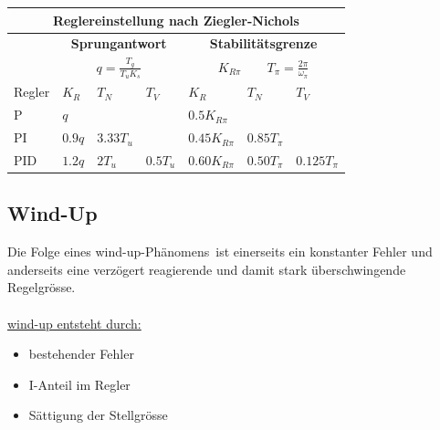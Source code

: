 	\begin{tabular}{|l|l|l|l|l|l|l|}
		\hline
		\multicolumn{7}{|c|}{
		  \textbf{Reglereinstellung nach Ziegler-Nichols}
		}
		\\ \hline
		& \multicolumn{3}{|c|}{\textbf{Sprungantwort}}
		& \multicolumn{3}{|c|}{\textbf{Stabilitätsgrenze}}
		\\
	    & \multicolumn{3}{|c|}{$q = \frac{T_g}{T_uK_s}$}
		& \multicolumn{3}{|c|}{$K_{R\pi} \qquad T_\pi = \frac{2\pi}{\omega_\pi}$}
		\\ \hline
		Regler 	& $K_R$ 	& $T_N$ 	& $T_V$ 	& $K_R$ 		& $T_N$ 	& $T_V$
		\\ \hline
		P 		& $q$ 		&			& 			& $0.5K_{R\pi}$	& 			&
		\\ \hline
		PI		& $0.9q$	& $3.33T_u$	& 			& $0.45K_{R\pi}$& $0.85T_\pi$&
		\\ \hline
		PID		& $1.2q$ 	& $2T_u$	& $0.5T_u$	& $0.60K_{R\pi}$& $0.50T_\pi$&$0.125T_\pi$ 
		\\ \hline
	\end{tabular}
	
		
	\subsection{Wind-Up }
		Die Folge eines \glqq wind-up-Phänomens\grqq\ ist einerseits ein konstanter
		Fehler und anderseits eine verzögert reagierende und damit stark überschwingende
		Regelgrösse.\\ \\
		\underline{wind-up entsteht durch:}\\
		\begin{itemize}
		\item bestehender Fehler
		\item I-Anteil im Regler
		\item Sättigung der Stellgrösse
		\end{itemize}
		
